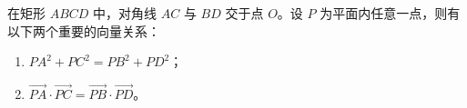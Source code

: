 \begin{statementbox}
在矩形 $ABCD$ 中，对角线 $AC$ 与 $BD$ 交于点 $O$。设 $P$ 为平面内任意一点，则有以下两个重要的向量关系：
\begin{enumerate}
    \item $PA^2 + PC^2 = PB^2 + PD^2$；
    \item $\vec{PA} \cdot \vec{PC} = \vec{PB} \cdot \vec{PD}$。
\end{enumerate}
\end{statementbox}